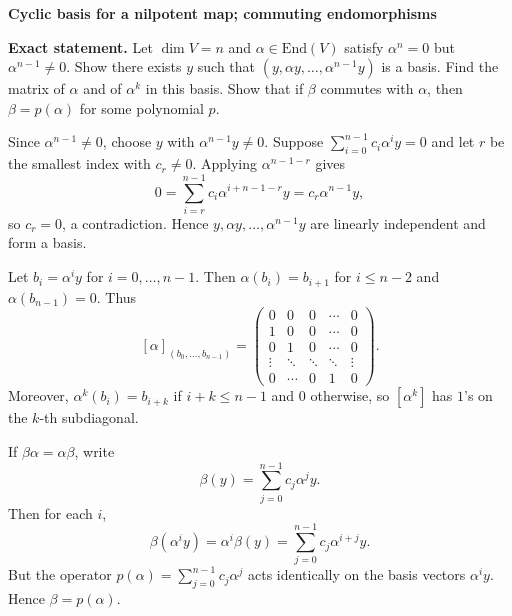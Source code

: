 \begin{problem}[CP-I-0085]
\label{prob:cp-i-0085}
\textbf{Cyclic basis for a nilpotent map; commuting endomorphisms}

\textbf{Exact statement.}
\hspace*{1.5em}Let $\dim V=n$ and $\alpha\in\mathrm{End}(V)$ satisfy $\alpha^n=0$ but $\alpha^{n-1}\neq 0$.
Show there exists $y$ such that $(y,\alpha y,\dots,\alpha^{n-1}y)$ is a basis.
Find the matrix of $\alpha$ and of $\alpha^k$ in this basis.
Show that if $\beta$ commutes with $\alpha$, then $\beta=p(\alpha)$ for some polynomial $p$.
\end{problem}

\begin{solution}
Since $\alpha^{n-1}\neq 0$, choose $y$ with $\alpha^{n-1}y\neq 0$.
Suppose $\sum_{i=0}^{n-1} c_i\alpha^i y=0$ and let $r$ be the smallest index with $c_r\neq 0$.
Applying $\alpha^{n-1-r}$ gives
\[
0=\sum_{i=r}^{n-1} c_i\alpha^{i+n-1-r}y=c_r\alpha^{n-1}y,
\]
so $c_r=0$, a contradiction. Hence $y,\alpha y,\dots,\alpha^{n-1}y$ are linearly independent and form a basis.

Let $b_i=\alpha^i y$ for $i=0,\dots,n-1$. Then $\alpha(b_i)=b_{i+1}$ for $i\le n-2$ and $\alpha(b_{n-1})=0$.
Thus
\[
[\alpha]_{(b_0,\dots,b_{n-1})}=
\begin{pmatrix}
	0&0&0&\cdots&0\\
	1&0&0&\cdots&0\\
	0&1&0&\cdots&0\\
	\vdots&\ddots&\ddots&\ddots&\vdots\\
	0&\cdots&0&1&0
\end{pmatrix}.
\]
Moreover, $\alpha^k(b_i)=b_{i+k}$ if $i+k\le n-1$ and $0$ otherwise, so $[\alpha^k]$ has $1$'s on the $k$-th subdiagonal.

If $\beta\alpha=\alpha\beta$, write
\[
\beta(y)=\sum_{j=0}^{n-1} c_j \alpha^j y.
\]
Then for each $i$,
\[
\beta(\alpha^i y)=\alpha^i\beta(y)=\sum_{j=0}^{n-1} c_j \alpha^{i+j}y.
\]
But the operator $p(\alpha)=\sum_{j=0}^{n-1} c_j \alpha^j$ acts identically on the basis vectors $\alpha^i y$.
Hence $\beta=p(\alpha)$.
\end{solution}


